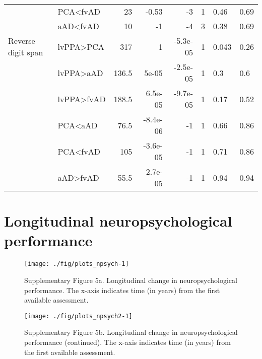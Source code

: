 \documentclass[]{article}
\begin{document}
\begin{table}[ht]
{\begin{tabular}{llrrrrll}
   & PCA<fvAD & 23 & -0.53 & -3 & 1 & 0.46 & 0.69 \\ 
   & aAD<fvAD & 10 & -1 & -4 & 3 & 0.38 & 0.69 \\ 
  Reverse digit span & lvPPA>PCA & 317 & 1 & -5.3e-05 & 1 & 0.043 & 0.26 \\ 
   & lvPPA>aAD & 136.5 & 5e-05 & -2.5e-05 & 1 & 0.3 & 0.6 \\ 
   & lvPPA>fvAD & 188.5 & 6.5e-05 & -9.7e-05 & 1 & 0.17 & 0.52 \\ 
   & PCA<aAD & 76.5 & -8.4e-06 & -1 & 1 & 0.66 & 0.86 \\ 
   & PCA<fvAD & 105 & -3.6e-05 & -1 & 1 & 0.71 & 0.86 \\ 
   & aAD>fvAD & 55.5 & 2.7e-05 & -1 & 1 & 0.94 & 0.94 \\ 
   \hline
\end{tabular}
}
\end{table}

\section*{Longitudinal neuropsychological
performance}\label{longitudinal-neuropsychological-performance}

\begin{figure}

{\centering \texttt{[image: ./fig/plots\_npsych-1]} 

}

\caption{Supplementary Figure 5a. Longitudinal change in neuropsychological performance. The x-axis indicates time (in years) from the first available assessment.}\label{fig:plots_npsych}
\end{figure}

\begin{figure}

{\centering \texttt{[image: ./fig/plots\_npsych2-1]} 

}

\caption{Supplementary Figure 5b. Longitudinal change in neuropsychological performance (continued). The x-axis indicates time (in years) from the first available assessment.}\label{fig:plots_npsych2}
\end{figure}
\end{document}
